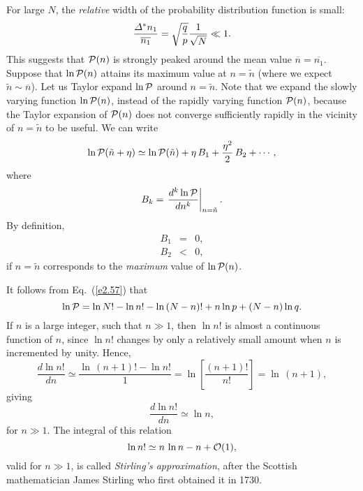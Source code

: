 For large $N$, the {\em relative}\/ width of the probability distribution function
is small:
\begin{equation}
\frac{{\mit\Delta}^\ast n_1}{\overline{n_1}} = \sqrt{\frac{q}{p}}\frac{1}{\sqrt{N}}
\ll 1.
\end{equation}
This suggests that ${\cal P}(n)$ is strongly peaked around the mean value
$\overline{n}=\overline{n_1}$. Suppose that $\ln{\cal P}(n)$ attains
its maximum value at $n=\tilde{n}$ (where we expect $\tilde{n}\sim 
\overline{n}$). Let us Taylor expand $\ln{\cal P}$ around $n=\tilde{n}$.
Note that we expand the  slowly varying function $\ln{\cal  P}(n)$,
instead of the rapidly varying function ${\cal P}(n)$,
because the Taylor expansion of 
${\cal P}(n)$ does not converge sufficiently rapidly  in the
vicinity of $n=\tilde{n}$  to be useful. 
We can write
\begin{equation}
\ln {\cal P}(\tilde{n}+\eta) \simeq \ln{\cal P}(\tilde{n}) +\eta\,
B_1+\frac{\eta^2}{2}\,B_2+\cdots ,
\end{equation}
where
\begin{equation}
B_k = \left.\frac{d^k \ln {\cal P}}{d n^k}\right|_{n=\tilde{n}}.
\end{equation}
By definition, 
\begin{eqnarray}
B_1&=& 0,\\
B_2&<& 0,
\end{eqnarray}
if $n=\tilde{n}$ corresponds to the {\em maximum}
 value of $\ln {\cal P}(n)$.


It follows from Eq.~(\ref{e2.57}) that
\begin{equation}
\ln {\cal P} = \ln N! - \ln n!- \ln \,(N-n)! +n\ln p +(N-n)\ln q.\label{e2.63}
\end{equation}
If $n$ is a large integer, such that $n\gg 1$, then $\ln n!$ is almost a
continuous function of $n$, since $\ln n!$ changes by only a relatively
small amount when $n$ is incremented by unity.
Hence,
\begin{equation}
\frac{d\ln n!}{dn} \simeq \frac{\ln\,(n+1)!-\ln n!}{1} =
\ln\!\left[\frac{(n+1)!}{n!}\right] = \ln\,(n+1),
\end{equation}
giving
\begin{equation}
\frac{d\ln n!}{d n} \simeq \ln n,
\end{equation}
for $n\gg 1$. The integral of this relation
\begin{equation}
\ln n! \simeq n\,\ln n - n +{\cal O}(1),\label{e2.65}
\end{equation}
valid for $n\gg 1$, is called {\em Stirling's approximation}, after the Scottish
mathematician James Stirling who first obtained it in 1730.

